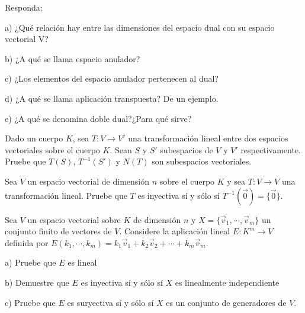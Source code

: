 \begin{exercise}
\item

Responda:

a)   ¿Qué relación hay entre las dimensiones del espacio dual con su espacio vectorial V?

b)   ¿A qué se llama espacio anulador?

c)  ¿Los elementos del espacio anulador pertenecen al dual?

d)  ¿A qué se llama aplicación transpuesta? De un ejemplo.

e)   ¿A qué se denomina doble dual?¿Para qué sirve?
\end{exercise}




\bigskip




\begin{exercise}
\item
Dado un cuerpo $K$, sea $T: V \rightarrow V'$ una transformación
lineal entre dos espacios vectoriales sobre el cuerpo $K$. Sean $S$ y $S'$
subespacios de $V$ y $V'$ respectivamente. Pruebe que $T(S)$,
$T^{-1}(S')$ y  $N(T)$ son subespacios vectoriales.
\end{exercise}

\begin{exercise}
\item
Sea $V$ un espacio vectorial de dimensión $n$ sobre el
cuerpo $K$ y sea $T: V \rightarrow V$ una transformación lineal.
Pruebe que $T$ es inyectiva sí y sólo sí $T^{-1}(\vec{0})=\{\vec{0}\}$.
\end{exercise}

\begin{exercise}
\item
Sea $V$ un espacio vectorial sobre $K$  de dimensión $n$ y $X=\{\vec{v}_1,
\cdots,\vec{v}_m\}$ un conjunto finito de vectores de $V$. Considere la
aplicación lineal $E:K^m \rightarrow V$ definida por $E(k_1, \cdots,k_m)=k_1\vec{v}_1+k_2\vec{v}_2+ \cdots+k_m\vec{v}_m$.

a)
Pruebe que $E$ es lineal

b)  Demuestre que $E$ es inyectiva sí y sólo sí $X$ es linealmente
independiente

c)  Pruebe que $E$ es suryectiva sí y sólo sí $X$ es un
conjunto de generadores de $V$.
\end{exercise}

